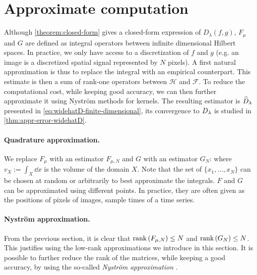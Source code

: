\section{Approximate computation}\label{sec:approximation}

Although \cref{theorem:closed-form} gives a closed-form expression of $D_\lambda(f,g)$, $F_\mu$ and $G$ are defined as integral operators between infinite dimensional Hilbert spaces. In practice, we only have access to a discretization of $f$ and $g$ (e.g. an image is a discretized spatial signal represented by $N$ pixels). A first natural approximation is thus to replace the integral with an empirical counterpart. This estimate is then a sum of rank-one operators between $\mathcal H$ and $\mathcal F$. To reduce the computational cost, while keeping good accuracy, we can then further approximate it using Nyström methods for kernels. The resulting estimator is $\widehat{D}_\lambda$ presented in \cref{eq:widehatD-finite-dimensional}, its convergence to $D_\lambda$ is studied in \cref{thm:appr-error-widehatD}.


\paragraph{Quadrature approximation.}

We replace $F_\mu$ with an estimator $F_{\mu, N}$ and $G$ with an estimator $G_N$:
where $v_X := \int_X \dd x$ is the volume of the domain $X$.
Note that the set of $\lbrace x_1, \ldots, x_N \rbrace$ can be chosen at random or arbitrarily to best approximate the integrals. $F$ and $G$ can be approximated using different points. In practice, they are often given as the positions of pixels of images, sample times of a time series.

\paragraph{Nyström approximation.}

From the previous section, it is clear that $\operatorname{rank}\left(F_{\mu, N}\right) \leq N$ and $\operatorname{rank}\left(G_N\right) \leq N$. This justifies using the low-rank approximations we introduce in this section. It is possible to further reduce the rank of the matrices, while keeping a good accuracy, by using the so-called {\em Nystr\"om approximation} \cite{williams2001using,drineas2005nystrom,rudi2015less}.

